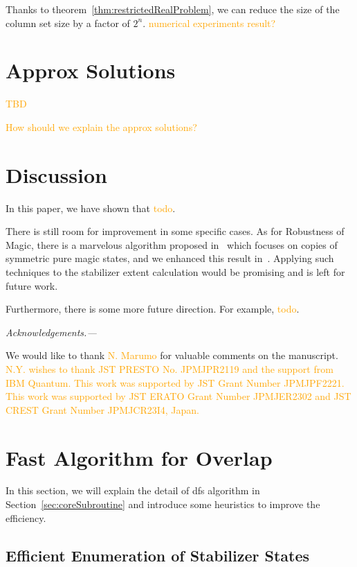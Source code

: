 \documentclass[a4paper, onecolumn, 11pt, longbibliography]{quantumarticle}
\newcommand{\orange}[1]{\textcolor{orange}{#1}}
\begin{document}
Thanks to theorem~\ref{thm:restrictedRealProblem},
we can reduce the size of the column set size
by a factor of $2^n$.
\orange{numerical experiments result?}

\section{Approx Solutions}

\orange{TBD}

\orange{How should we explain the approx solutions?}

\section{Discussion}

In this paper, we have shown that \orange{todo}.

There is still room for improvement
in some specific cases.
As for Robustness of Magic,
there is a marvelous algorithm
proposed in~\cite{Heinrich2019robustnessofmagic}
which focuses on copies of symmetric pure magic states,
and we enhanced this result in~\cite{hamaguchiHandbookEfficientlyQuantifying2023}.
Applying such techniques to the stabilizer extent calculation
would be promising and is left for future work.

Furthermore, there is some more future direction.
For example, \orange{todo}.

\emph{Acknowledgements.---}

We would like to thank \orange{N. Marumo} for valuable comments on the manuscript.
\orange{N.Y. wishes to thank JST PRESTO No. JPMJPR2119 and the support
  from IBM Quantum. This work was supported by JST Grant Number JPMJPF2221.
  This work was supported by JST ERATO Grant Number JPMJER2302 and JST CREST
  Grant Number JPMJCR23I4, Japan.}




\appendix

\section{Fast Algorithm for Overlap}

In this section, we will explain the detail of
dfs algorithm in Section~\ref{sec:coreSubroutine}
and introduce some heuristics to improve the efficiency.

\subsection{Efficient Enumeration of Stabilizer States}
\label{sec:efficientEnumeration}
\end{document}
